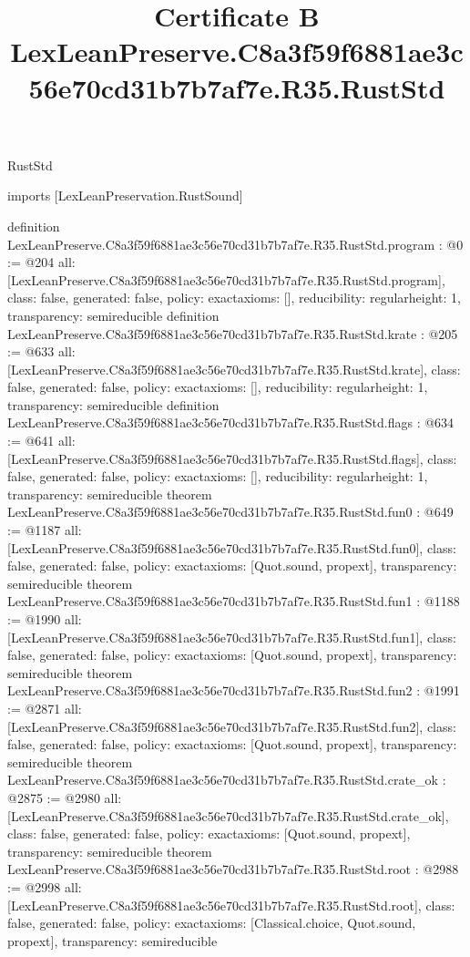 \begin{lexlean}{RustStd}
\title{Certificate B LexLeanPreserve.C8a3f59f6881ae3c56e70cd31b7b7af7e.R35.RustStd}
\begin{coremodule}
imports [LexLeanPreservation.RustSound]

definition LexLeanPreserve.C8a3f59f6881ae3c56e70cd31b7b7af7e.R35.RustStd.program : @0 := @204 {
  all: [LexLeanPreserve.C8a3f59f6881ae3c56e70cd31b7b7af7e.R35.RustStd.program],
  class: false,
  generated: false,
  policy: exact{axioms: []},
  reducibility: regular{height: 1},
  transparency: semireducible
}
definition LexLeanPreserve.C8a3f59f6881ae3c56e70cd31b7b7af7e.R35.RustStd.krate : @205 := @633 {
  all: [LexLeanPreserve.C8a3f59f6881ae3c56e70cd31b7b7af7e.R35.RustStd.krate],
  class: false,
  generated: false,
  policy: exact{axioms: []},
  reducibility: regular{height: 1},
  transparency: semireducible
}
definition LexLeanPreserve.C8a3f59f6881ae3c56e70cd31b7b7af7e.R35.RustStd.flags : @634 := @641 {
  all: [LexLeanPreserve.C8a3f59f6881ae3c56e70cd31b7b7af7e.R35.RustStd.flags],
  class: false,
  generated: false,
  policy: exact{axioms: []},
  reducibility: regular{height: 1},
  transparency: semireducible
}
theorem LexLeanPreserve.C8a3f59f6881ae3c56e70cd31b7b7af7e.R35.RustStd.fun0 : @649 := @1187 {
  all: [LexLeanPreserve.C8a3f59f6881ae3c56e70cd31b7b7af7e.R35.RustStd.fun0],
  class: false,
  generated: false,
  policy: exact{axioms: [Quot.sound, propext]},
  transparency: semireducible
}
theorem LexLeanPreserve.C8a3f59f6881ae3c56e70cd31b7b7af7e.R35.RustStd.fun1 : @1188 := @1990 {
  all: [LexLeanPreserve.C8a3f59f6881ae3c56e70cd31b7b7af7e.R35.RustStd.fun1],
  class: false,
  generated: false,
  policy: exact{axioms: [Quot.sound, propext]},
  transparency: semireducible
}
theorem LexLeanPreserve.C8a3f59f6881ae3c56e70cd31b7b7af7e.R35.RustStd.fun2 : @1991 := @2871 {
  all: [LexLeanPreserve.C8a3f59f6881ae3c56e70cd31b7b7af7e.R35.RustStd.fun2],
  class: false,
  generated: false,
  policy: exact{axioms: [Quot.sound, propext]},
  transparency: semireducible
}
theorem LexLeanPreserve.C8a3f59f6881ae3c56e70cd31b7b7af7e.R35.RustStd.crate_ok : @2875 := @2980 {
  all: [LexLeanPreserve.C8a3f59f6881ae3c56e70cd31b7b7af7e.R35.RustStd.crate_ok],
  class: false,
  generated: false,
  policy: exact{axioms: [Quot.sound, propext]},
  transparency: semireducible
}
theorem LexLeanPreserve.C8a3f59f6881ae3c56e70cd31b7b7af7e.R35.RustStd.root : @2988 := @2998 {
  all: [LexLeanPreserve.C8a3f59f6881ae3c56e70cd31b7b7af7e.R35.RustStd.root],
  class: false,
  generated: false,
  policy: exact{axioms: [Classical.choice, Quot.sound, propext]},
  transparency: semireducible
}


\end{coremodule}
\end{lexlean}
